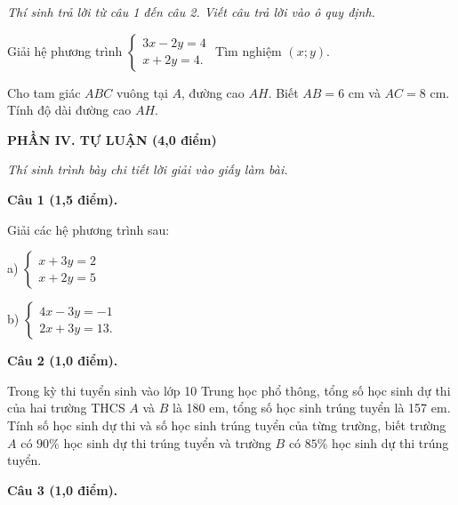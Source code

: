 \documentclass[12pt,a4paper]{article}
\begin{document}
\textit{Thí sinh trả lời từ câu 1 đến câu 2. Viết câu trả lời vào ô quy định.}

\vspace{1mm}
\begin{ex}
Giải hệ phương trình $\begin{cases} 3x - 2y = 4 \\ x + 2y = 4. \end{cases}$ Tìm nghiệm $(x; y)$.
\end{ex}

\begin{ex}
Cho tam giác $ABC$ vuông tại $A$, đường cao $AH$. Biết $AB = 6\text{ cm}$ và $AC = 8\text{ cm}$. Tính độ dài đường cao $AH$.
\end{ex}


\vspace{2mm}
\noindent\textbf{\large PHẦN IV. TỰ LUẬN (4,0 điểm)}

\textit{Thí sinh trình bày chi tiết lời giải vào giấy làm bài.}

\vspace{1mm}
\noindent\textbf{Câu 1 (1,5 điểm).}

Giải các hệ phương trình sau:\par a) $\begin{cases} x + 3y = 2 \\ x + 2y = 5 \end{cases}$\par b) $\begin{cases} 4x - 3y = -1 \\ 2x + 3y = 13. \end{cases}$

\vspace{2mm}
\noindent\textbf{Câu 2 (1,0 điểm).}

Trong kỳ thi tuyển sinh vào lớp 10 Trung học phổ thông, tổng số học sinh dự thi của hai trường THCS $A$ và $B$ là 180 em, tổng số học sinh trúng tuyển là 157 em. Tính số học sinh dự thi và số học sinh trúng tuyển của từng trường, biết trường $A$ có $90\%$ học sinh dự thi trúng tuyển và trường $B$ có $85\%$ học sinh dự thi trúng tuyển.

\vspace{2mm}
\noindent\textbf{Câu 3 (1,0 điểm).}
\end{document}
